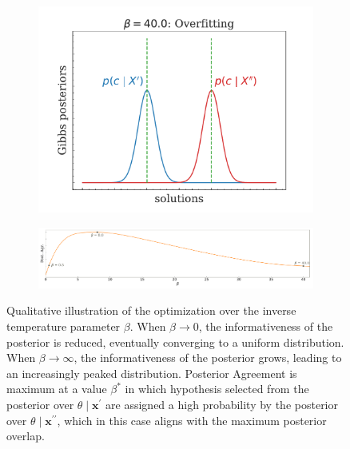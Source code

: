 \begin{figure}[H]
\begin{subfigure}[b]{0.3\textwidth}
        \includegraphics[width=\textwidth]{img/theoretical_background/method_beta=40.0.pdf}
    \end{subfigure}

    \vspace{1em}

    \begin{subfigure}[b]{0.97\textwidth}
        \centering
        \includegraphics[width=\textwidth]{img/theoretical_background/gibbs_betas.pdf}
    \end{subfigure}

    
    \caption{
        Qualitative illustration of the optimization over the inverse temperature parameter $\beta$. 
        When $\beta \longrightarrow 0$, the informativeness of 
        the posterior is reduced, eventually converging to a uniform distribution. When
        $\beta \longrightarrow \infty$, the informativeness of the posterior grows, leading
        to an increasingly peaked distribution. Posterior Agreement is maximum at a value $\beta^{*}$ 
        in which hypothesis selected from the posterior over $\theta \mid \bm{x^\prime}$ are assigned
        a high probability by the posterior over $\theta \mid \bm{x^{\prime\prime}}$, which in this case
        aligns with the maximum posterior overlap.
        \cite{buhmannDataScienceAlgorithms2022}
    }
    \label{fig:illustrate_beta}
\end{figure}


